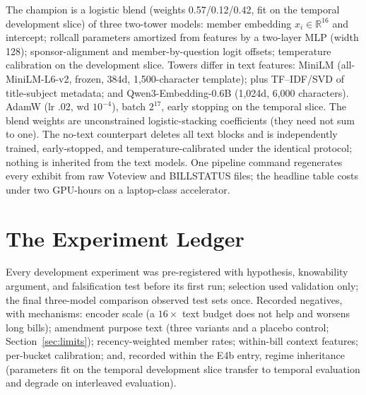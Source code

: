 \documentclass[12pt]{article}
\begin{document}
The champion is a logistic blend (weights 0.57/0.12/0.42, fit on the
temporal development slice) of three two-tower models: member
embedding $x_i \in \mathbb{R}^{16}$ and intercept; rollcall
parameters amortized from features by a two-layer MLP (width 128);
sponsor-alignment and member-by-question logit offsets; temperature
calibration on the development slice. Towers differ in text features:
MiniLM (all-MiniLM-L6-v2, frozen, 384d, 1,500-character template);
plus TF--IDF/SVD of title-subject metadata; and Qwen3-Embedding-0.6B
(1,024d, 6,000 characters). AdamW (lr .02, wd $10^{-4}$), batch
$2^{17}$, early stopping on the temporal slice. The blend weights are
unconstrained logistic-stacking coefficients (they need not sum to
one). The no-text counterpart deletes all text blocks and is
independently trained, early-stopped, and temperature-calibrated
under the identical protocol; nothing is inherited from the text
models. One
pipeline command regenerates every exhibit from raw Voteview and
BILLSTATUS files; the headline table costs under two GPU-hours on a
laptop-class accelerator.

\section{The Experiment Ledger}
\label{app:ledger}

Every development experiment was pre-registered with hypothesis,
knowability argument, and falsification test before its first run;
selection used validation only; the final three-model comparison
observed test sets once. Recorded negatives, with mechanisms: encoder
scale (a $16\times$ text budget does not help and worsens long
bills); amendment purpose text (three variants and a placebo control;
Section~\ref{sec:limits}); recency-weighted member rates; within-bill
context features; per-bucket calibration; and, recorded within the
E4b entry, regime inheritance (parameters fit on the temporal
development slice transfer to temporal evaluation and degrade on
interleaved evaluation).
\end{document}
